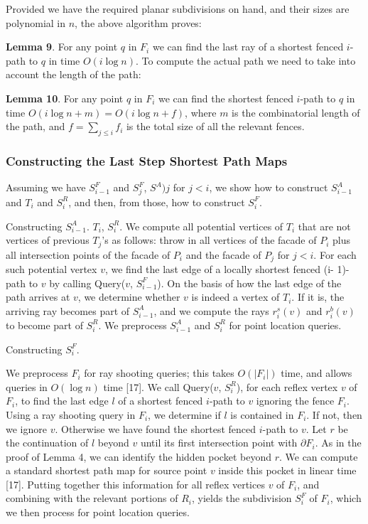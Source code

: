 \documentclass[a4paper]{article}
\begin{document}
Provided we have the required planar subdivisions on hand, and their sizes are polynomial in \(n\), the above algorithm proves:

\textbf{Lemma 9}. For any point \(q\) in \(F_i\) we can find the last ray of a shortest fenced \(i\)-path to \(q\) in time \(O(i \log n)\). To compute the actual path we need to take into account the length of the path:

\textbf{Lemma 10}. For any point \(q\) in \(F_i\) we can find the shortest fenced \(i\)-path to \(q\) in time \(O(i \log n + m) = O(i \log n + f)\), where \(m\) is the combinatorial length of the path, and \(f = \sum_{j \le i} f_i\) is the total size of all the relevant fences. 

\subsubsection{Constructing the Last Step Shortest Path Maps}

Assuming we have \(S^F_{i-1}\) and \(S^F_j\), \(S^A)j\) for \(j < i\), we show how to construct \(S^A_{i-1}\) and \(T_i\) and \(S^R_i\), and then, from those, how to construct \(S^F_i\). 

Constructing \(S^A_{i-1}\). \(T_i\), \(S^R_i\). We compute all potential vertices of \(T_i\) that are not vertices of previous \(T_j\)'s as follows: throw in all vertices of the facade of \(P_i\) plus all intersection points of the facade of \(P_i\) and the facade of \(P_j\) for \(j < i\). For each such potential vertex \(v\), we find the last edge of a locally shortest fenced (i- 1)-path to \(v\) by calling Query(\(v\), \(S^F_{i-1}\)). On the basis of how the last edge of the path arrives at \(v\), we determine whether \(v\) is indeed a vertex of \(T_i\). If it is, the arriving ray becomes part of \(S^A_{i-1}\), and we compute the rays \(r^s_i(v)\) and \(r^b_i(v)\) to become part of \(S^R_i\). We preprocess \(S^A_{i-1}\) and \(S^R_i\) for point location queries.

Constructing \(S^F_i\). 

We preprocess \(F_i\) for ray shooting queries; this takes \(O(|F_i|)\) time, and allows queries in \(O(\log n)\) time [17]. We call Query(\(v\), \(S^R_i\)), for each reflex vertex \(v\) of \(F_i\), to find the last edge \(l\) of a shortest fenced \(i\)-path to \(v\) ignoring the fence \(F_i\). Using a ray shooting query in \(F_i\), we determine if \(l\) is contained in \(F_i\). If not, then we ignore \(v\). Otherwise we have found the shortest fenced \(i\)-path to \(v\). Let \(r\) be the continuation of \(l\) beyond \(v\) until its first intersection point with \(\partial F_i\). As in the proof of Lemma 4, we can identify the hidden pocket beyond \(r\). We can compute a standard shortest path map for source point \(v\) inside this pocket in linear time [17]. Putting together this information for all reflex vertices \(v\) of \(F_i\), and combining with the relevant portions of \(R_i\), yields the subdivision \(S^F_i\) of \(F_i\), which we then process for point location queries. 
\end{document}
